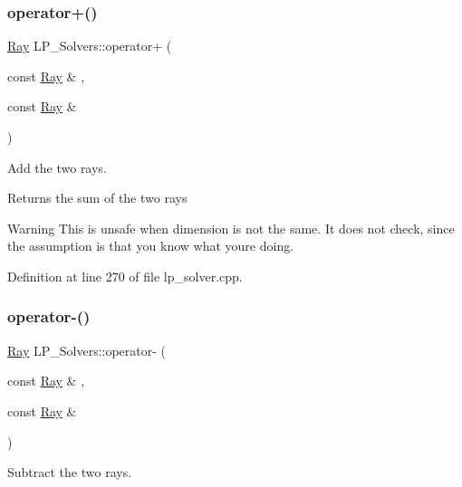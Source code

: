 \subsubsection{\texorpdfstring{operator+()}{operator+()}}
{\footnotesize\ttfamily \hyperlink{group___c_l_s_solvers_class_l_p___solvers_1_1_ray}{Ray} L\+P\+\_\+\+Solvers\+::operator+ (\begin{DoxyParamCaption}\item[{const \hyperlink{group___c_l_s_solvers_class_l_p___solvers_1_1_ray}{Ray} \&}]{,  }\item[{const \hyperlink{group___c_l_s_solvers_class_l_p___solvers_1_1_ray}{Ray} \&}]{ }\end{DoxyParamCaption})}



Add the two rays. 

\begin{DoxyReturn}{Returns}
the sum of the two rays 
\end{DoxyReturn}
\begin{DoxyWarning}{Warning}
This is unsafe when dimension is not the same. It does not check, since the assumption is that you know what you\textquotesingle{}re doing. 
\end{DoxyWarning}


Definition at line 270 of file lp\+\_\+solver.\+cpp.

\mbox{\label{group___c_l_s_solvers_gac20f6443d37909c326bb31c0399ea634}} 
\subsubsection{\texorpdfstring{operator-\/()}{operator-()}}
{\footnotesize\ttfamily \hyperlink{group___c_l_s_solvers_class_l_p___solvers_1_1_ray}{Ray} L\+P\+\_\+\+Solvers\+::operator-\/ (\begin{DoxyParamCaption}\item[{const \hyperlink{group___c_l_s_solvers_class_l_p___solvers_1_1_ray}{Ray} \&}]{,  }\item[{const \hyperlink{group___c_l_s_solvers_class_l_p___solvers_1_1_ray}{Ray} \&}]{ }\end{DoxyParamCaption})}



Subtract the two rays. 

